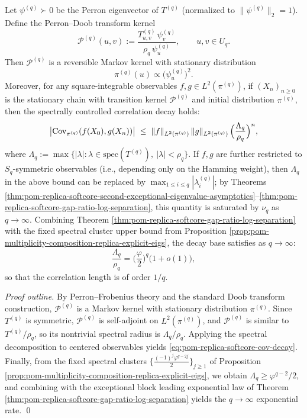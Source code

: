 \begin{theorem}\label{thm:pom-replica-softcore-doob-reversible-markov-corr}
Let \(\psi^{(q)}\succ 0\) be the Perron eigenvector of \(T^{(q)}\) (normalized to \(\|\psi^{(q)}\|_2=1\)).
Define the Perron--Doob transform kernel
\[
\mathcal{P}^{(q)}(u,v)
:=\frac{T^{(q)}_{u,v}\,\psi^{(q)}_{v}}{\rho_q\,\psi^{(q)}_{u}},
\qquad u,v\in U_q.
\]
Then \(\mathcal{P}^{(q)}\) is a reversible Markov kernel with stationary distribution
\[
\pi^{(q)}(u)\propto \bigl(\psi^{(q)}_{u}\bigr)^2.
\]
Moreover, for any square-integrable observables \(f,g\in L^2(\pi^{(q)})\), if \((X_n)_{n\ge 0}\) is the stationary chain with transition kernel \(\mathcal{P}^{(q)}\) and initial distribution \(\pi^{(q)}\), then the spectrally controlled correlation decay holds:
\begin{equation}\label{eq:pom-replica-softcore-cov-decay}
\bigl|\mathrm{Cov}_{\pi^{(q)}}(f(X_0),g(X_n))\bigr|
\;\le\;
\|f\|_{L^2(\pi^{(q)})}\,\|g\|_{L^2(\pi^{(q)})}\,
\Bigl(\frac{\Lambda_q}{\rho_q}\Bigr)^{n},
\end{equation}
where \(\Lambda_q:=\max\{|\lambda|:\lambda\in\mathrm{spec}(T^{(q)}),\ |\lambda|<\rho_q\}\).
If \(f,g\) are further restricted to \(S_q\)-symmetric observables (i.e., depending only on the Hamming weight), then \(\Lambda_q\) in the above bound can be replaced by
\(
\max_{1\le i\le q}|\lambda_i^{(q)}|
\);
by Theorems \ref{thm:pom-replica-softcore-second-exceptional-eigenvalue-asymptotics}--\ref{thm:pom-replica-softcore-gap-ratio-log-separation}, this quantity is saturated by \(\nu_q\) as \(q\to\infty\).
Combining Theorem \ref{thm:pom-replica-softcore-gap-ratio-log-separation} with the fixed spectral cluster upper bound from Proposition \ref{prop:pom-multiplicity-composition-replica-explicit-eigs},
the decay base satisfies as \(q\to\infty\):
\[
\frac{\Lambda_q}{\rho_q}
=\Big(\frac{\varphi}{2}\Big)^q\bigl(1+o(1)\bigr),
\]
so that the correlation length is of order \(1/q\).
\end{theorem}
\begin{proof}[Proof outline]
By Perron--Frobenius theory and the standard Doob transform construction, \(\mathcal{P}^{(q)}\) is a Markov kernel with stationary distribution \(\pi^{(q)}\).
Since \(T^{(q)}\) is symmetric, \(\mathcal{P}^{(q)}\) is self-adjoint on \(L^2(\pi^{(q)})\), and
\(
\mathcal{P}^{(q)}
\)
is similar to
\(
T^{(q)}/\rho_q
\),
so its nontrivial spectral radius is \(\Lambda_q/\rho_q\).
Applying the spectral decomposition to centered observables yields \eqref{eq:pom-replica-softcore-cov-decay}.
Finally, from the fixed spectral clusters
\(\bigl\{ \frac{(-1)^j\varphi^{q-2j}}{2}\bigr\}_{j\ge 1}\)
of Proposition \ref{prop:pom-multiplicity-composition-replica-explicit-eigs},
we obtain \(\Lambda_q\ge \varphi^{q-2}/2\), and combining with the exceptional block leading exponential law of Theorem \ref{thm:pom-replica-softcore-gap-ratio-log-separation} yields the \(q\to\infty\) exponential rate. \qed
\end{proof}


